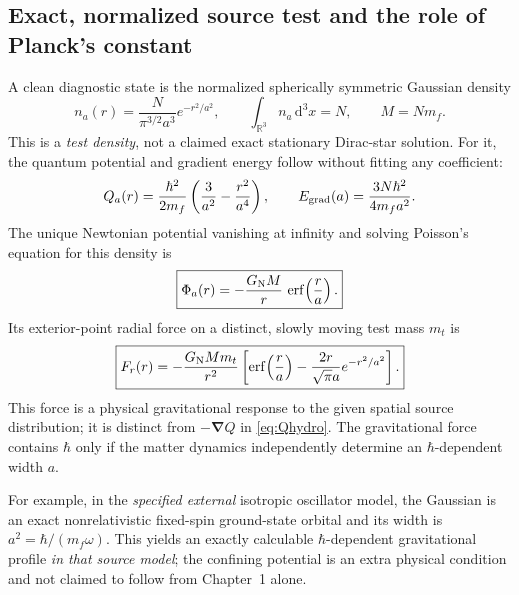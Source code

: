 \documentclass[11pt,a4paper,oneside]{report}
\numberwithin{equation}{chapter}
\theoremstyle{definition}\newtheorem{definition}[theorem]{Definition}
\theoremstyle{remark}\newtheorem{remark}[theorem]{Remark}
\newcommand{\dd}{\mathrm d}
\begin{document}
\subsection{Exact, normalized source test and the role of Planck's constant}
A clean diagnostic state is the normalized spherically symmetric Gaussian density
\begin{equation}
 n_a(r)=\frac{N}{\pi^{3/2}a^3}e^{-r^2/a^2},
 \qquad \int_{\mathbb R^3}n_a\,\dd^3x=N,
 \qquad M=Nm_f.
 \label{eq:gaussiandensity}
\end{equation}
This is a \emph{test density}, not a claimed exact stationary Dirac-star solution. For it, the quantum potential and gradient energy follow without fitting any coefficient:
\begin{equation}
 Q_a(r)=\frac{\hbar^2}{2m_f}\left(\frac3{a^2}-\frac{r^2}{a^4}\right),
 \qquad E_{\rm grad}(a)=\frac{3N\hbar^2}{4m_fa^2}.
 \label{eq:gaussianQ}
\end{equation}
The unique Newtonian potential vanishing at infinity and solving Poisson's equation for this density is
\begin{equation}
\boxed{\displaystyle
\Phi_a(r)=-\frac{G_{\rm N}M}{r}\,\operatorname{erf}\!\left(\frac ra\right).}
\label{eq:gaussianPhi}
\end{equation}
Its exterior-point radial force on a distinct, slowly moving test mass $m_t$ is
\begin{equation}
\boxed{\displaystyle
 F_r(r)=-\frac{G_{\rm N}Mm_t}{r^2}
 \left[\operatorname{erf}\!\left(\frac ra\right)-\frac{2r}{\sqrt\pi a}e^{-r^2/a^2}\right].}
 \label{eq:gaussianForce}
\end{equation}
This force is a physical gravitational response to the given spatial source distribution; it is distinct from $-\bm\nabla Q$ in \eqref{eq:Qhydro}. The gravitational force contains $\hbar$ only if the matter dynamics independently determine an $\hbar$-dependent width $a$.

For example, in the \emph{specified external} isotropic oscillator model, the Gaussian is an exact nonrelativistic fixed-spin ground-state orbital and its width is $a^2=\hbar/(m_f\omega)$. This yields an exactly calculable $\hbar$-dependent gravitational profile \emph{in that source model}; the confining potential is an extra physical condition and not claimed to follow from Chapter~1 alone.
\end{document}
